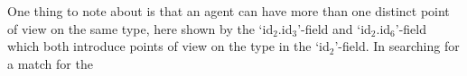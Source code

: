 \begin{ex}
% 
\label{ex:info-state-false-god}
\end{ex} 
One thing to note about \preveg{} is that an agent can have more than
one distinct point of view on the same type, here shown by the
`id$_2$.id$_3$'-field and `id$_2$.id$_6$'-field which both introduce points of view
on the type in the `id$_2$'-field.  In searching for a match for the
